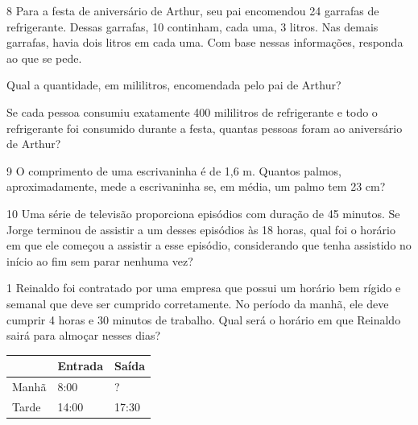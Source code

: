 \pagebreak

\num{8} Para a festa de aniversário de Arthur, seu pai encomendou 24
garrafas de refrigerante. Dessas garrafas, 10 continham, cada uma, 3
litros. Nas demais garrafas, havia dois litros em cada uma. Com base
nessas informações, responda ao que se pede.

\begin{escolha}
\item
  Qual a quantidade, em mililitros, encomendada pelo pai de Arthur?

\bigskip
\bigskip

\item
  Se cada pessoa consumiu exatamente 400 mililitros de refrigerante e
  todo o refrigerante foi consumido durante a festa, quantas pessoas
  foram ao aniversário de Arthur?

\bigskip
\end{escolha}


\num{9} O comprimento de uma escrivaninha é de 1,6 m. Quantos palmos,
aproximadamente, mede a escrivaninha se, em média, um palmo tem 23 cm?

\bigskip\bigskip\bigskip

\num{10} Uma série de televisão proporciona episódios com duração de 45
minutos. Se Jorge terminou de assistir a um desses episódios às 18 horas, qual
foi o horário em que ele começou a assistir a esse episódio, considerando que tenha assistido
no início ao fim sem parar nenhuma vez?


\pagebreak
{}

\num{1} Reinaldo foi contratado por uma empresa que possui um horário bem
rígido e semanal que deve ser cumprido corretamente. No período da manhã,
ele deve cumprir 4 horas e 30 minutos de trabalho. Qual será o horário em que
Reinaldo sairá para almoçar nesses dias?

\begin{longtable}[]{@{}lll@{}}
\toprule
& Entrada & Saída\tabularnewline
\midrule
\endhead
Manhã & 8:00 & ?\tabularnewline
Tarde & 14:00 & 17:30\tabularnewline
\bottomrule
\end{longtable}


